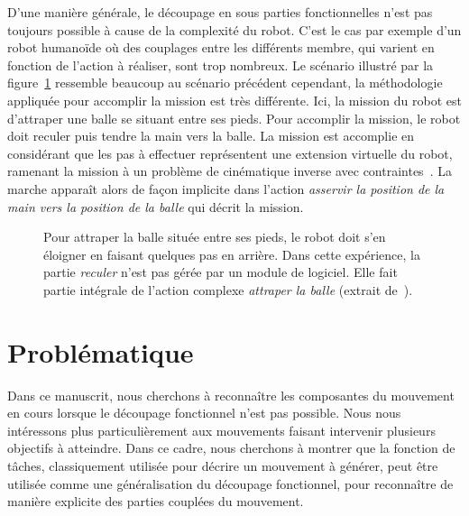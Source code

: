 D'une manière générale, le découpage en sous parties fonctionnelles n'est pas toujours
possible à cause de la complexité du robot. C'est le cas par exemple
d'un robot humanoïde où des couplages entre les différents
membre, qui varient en fonction de l'action à réaliser, sont trop nombreux.
Le scénario illustré par la figure~\ref{fig:graspFeet} ressemble beaucoup
au scénario précédent cependant, la méthodologie appliquée pour accomplir la mission est très différente.
Ici, la mission du robot est d'attraper une balle se situant entre ses pieds. Pour
accomplir la mission, le robot doit reculer puis tendre la main vers la balle.
La mission est accomplie en considérant que les pas à effectuer
représentent une extension virtuelle du robot, ramenant la mission à un
problème de cinématique inverse avec contraintes~\cite{kanoun10}.
La marche apparaît alors de façon implicite dans 
l'action \emph{asservir la position de la main vers la position de la balle} qui décrit la mission. 
\begin{figure}
  \centering
  \caption[Planification de pas formulé en problème de cinématique inverse.]{Pour attraper la balle située entre ses pieds, le robot doit s'en éloigner en faisant quelques pas
  en arrière. Dans cette expérience, la partie \emph{reculer} n'est pas gérée par un module de logiciel.
  Elle fait partie intégrale de l'action complexe \emph{attraper la balle} (extrait de~\cite{kanoun10}).}
  \label{fig:graspFeet}
\end{figure}

\section{Problématique}
Dans ce manuscrit, nous cherchons à reconnaître les composantes
du mouvement en cours lorsque le découpage fonctionnel n'est pas possible.
Nous nous intéressons plus particulièrement aux mouvements faisant intervenir
plusieurs objectifs à atteindre.
Dans ce cadre, nous cherchons à montrer que la fonction de t\^aches,
classiquement utilisée pour décrire un mouvement à générer, peut
être utilisée comme une généralisation du découpage fonctionnel, 
pour reconnaître de manière explicite des parties couplées du mouvement.

